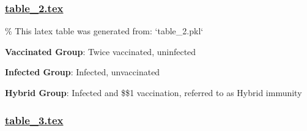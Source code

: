 \documentclass[11pt]{article}
\begin{document}
\subsubsection*{\hyperlink{code-LaTeX Table Design-table-2-tex}{table\_2.tex}}

\begin{codeoutput}
\% This latex table was generated from: `table\_2.pkl`
\begin{table}[h]
\caption{Vaccination group impact on total time at risk among infected individuals}
\label{table:table2VaccinatedGroupTimeAtRisk}
\begin{threeparttable}
\renewcommand{\TPTminimum}{\linewidth}
\begin{tablenotes}
\footnotesize
\item \textbf{Vaccinated Group}: Twice vaccinated, uninfected
\item \textbf{Infected Group}: Infected, unvaccinated
\item \textbf{Hybrid Group}: Infected and \$\geq\$1 vaccination, referred to as Hybrid immunity
\end{tablenotes}
\end{threeparttable}
\end{table}
\end{codeoutput}

\subsubsection*{\hyperlink{code-LaTeX Table Design-table-3-tex}{table\_3.tex}}
\end{document}
